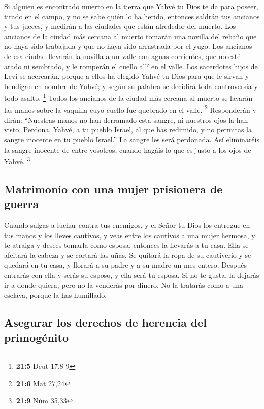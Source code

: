  Si alguien es encontrado muerto en la tierra que Yahvé tu
Dios te da para poseer, tirado en el campo, y no se sabe quién lo ha
herido,  entonces saldrán tus ancianos y tus jueces, y
medirán a las ciudades que están alrededor del muerto. 
Los ancianos de la ciudad más cercana al muerto tomarán una novilla del
rebaño que no haya sido trabajada y que no haya sido arrastrada por el
yugo.  Los ancianos de esa ciudad llevarán la novilla a un
valle con aguas corrientes, que no esté arado ni sembrado, y le romperán
el cuello allí en el valle.  Los sacerdotes hijos de Leví
se acercarán, porque a ellos ha elegido Yahvé tu Dios para que le sirvan
y bendigan en nombre de Yahvé; y según su palabra se decidirá toda
controversia y todo asalto. \footnote{\textbf{21:5} Deut 17,8-9}
 Todos los ancianos de la ciudad más cercana al muerto se
lavarán las manos sobre la vaquilla cuyo cuello fue quebrado en el
valle. \footnote{\textbf{21:6} Mat 27,24}  Responderán y
dirán: ``Nuestras manos no han derramado esta sangre, ni nuestros ojos
la han visto.  Perdona, Yahvé, a tu pueblo Israel, al que
has redimido, y no permitas la sangre inocente en tu pueblo Israel.'' La
sangre les será perdonada.  Así eliminaréis la sangre
inocente de entre vosotros, cuando hagáis lo que es justo a los ojos de
Yahvé. \footnote{\textbf{21:9} Núm 35,33}

\hypertarget{matrimonio-con-una-mujer-prisionera-de-guerra}{%
\subsection{Matrimonio con una mujer prisionera de
guerra}\label{matrimonio-con-una-mujer-prisionera-de-guerra}}

 Cuando salgas a luchar contra tus enemigos, y el Señor
tu Dios los entregue en tus manos y los lleves cautivos, 
y veas entre los cautivos a una mujer hermosa, y te atraiga y desees
tomarla como esposa,  entonces la llevarás a tu casa.
Ella se afeitará la cabeza y se cortará las uñas.  Se
quitará la ropa de su cautiverio y se quedará en tu casa, y llorará a su
padre y a su madre un mes entero. Después entrarás con ella y serás su
esposo, y ella será tu esposa.  Si no te gusta, la
dejarás ir a donde quiera, pero no la venderás por dinero. No la
tratarás como a una esclava, porque la has humillado.

\hypertarget{asegurar-los-derechos-de-herencia-del-primoguxe9nito}{%
\subsection{Asegurar los derechos de herencia del
primogénito}\label{asegurar-los-derechos-de-herencia-del-primoguxe9nito}}

